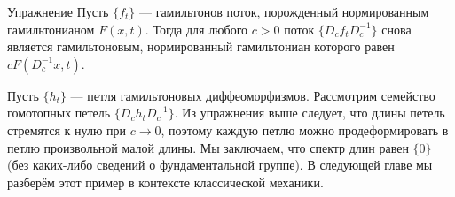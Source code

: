 \begin{thm*}{Упражнение}
Пусть $\{f_t\}$ --- гамильтонов поток, порожденный нормированным
гамильтонианом $F (x, t)$.
Тогда для любого $c> 0$ поток $\{D_c f_t D_c^{-1}\}$ снова является
гамильтоновым, нормированный гамильтониан которого равен $cF (D_c^{-1} x, t)$.
\end{thm*}

Пусть $\{h_t\}$ --- петля гамильтоновых диффеоморфизмов.
Рассмотрим семейство гомотопных петель $\{D_c h_t D_c ^{-1}\}$.
Из упражнения выше следует, что длины петель стремятся к нулю при $c \to 0$, поэтому каждую петлю можно продеформировать в петлю произвольной малой длины.
Мы заключаем, что спектр длин равен $\{0\}$ (без каких-либо сведений о фундаментальной группе).
В следующей главе мы разберём этот пример в контексте классической механики.

